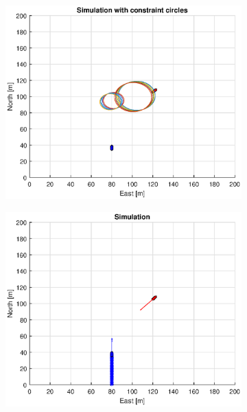 \begin{figure}[!b]
\begin{subfigure}[b]{0.499\textwidth}
    \end{subfigure}
    \hfill
    \\
    \begin{subfigure}[b]{0.49\textwidth}
        \centering
        \includegraphics[width=\textwidth]{Images/Figures/sving_GW/Simple0_f1_Frame3}
    \end{subfigure}
    \hfill
    \begin{subfigure}[b]{0.499\textwidth}
        \centering
        \includegraphics[width=\textwidth]{Images/Figures/sving_GW/Simple0_f600_Frame3}
    \end{subfigure}
    \hfill
\end{figure}%
